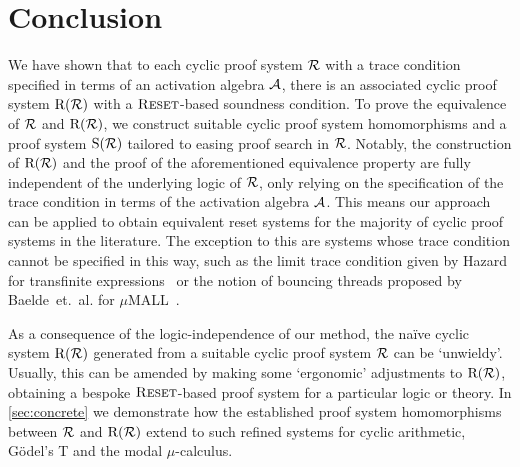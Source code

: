 \section{Conclusion}
\label{sec:conclusion}

We have shown that to each cyclic proof system $\mathcal{R}$ with a trace condition
specified in terms of an activation algebra $\mathcal{A}$, there is an associated cyclic
proof system $\mathrm{R}(\mathcal{R})$ with a $\textsc{Reset}$-based soundness condition.
To prove the equivalence of $\mathcal{R}$ and $\mathrm{R}(\mathcal{R})$, we construct suitable cyclic proof
system homomorphisms and a proof system $\mathrm{S}(\mathcal{R})$ tailored to easing proof
search in $\mathcal{R}$. Notably, the construction of $\mathrm{R}(\mathcal{R})$ and the proof of the
aforementioned equivalence property
are fully independent of the underlying logic of $\mathcal{R}$, only relying on
the specification of the trace condition in terms of the activation algebra \( \mathcal{A} \).
This means our approach can be applied to obtain equivalent reset systems
for the majority of cyclic proof systems in the literature.
The exception to this are systems whose trace condition
cannot be specified in this way, such as the limit trace condition given by Hazard
for transfinite expressions~\parencite{hazardCyclicProofsTransfinite2022} or the notion of
bouncing threads proposed by Baelde~et.~al. for
$\mu$MALL~\parencite{baeldeBouncingThreadsCircular2022}.

As a consequence of the logic-independence of our method, the na\"ive cyclic
system $\mathrm{R}(\mathcal{R})$ generated from a suitable cyclic proof system $\mathcal{R}$ can be
`unwieldy'. Usually, this can be amended by making some `ergonomic' adjustments
to $\mathrm{R}(\mathcal{R})$, obtaining a bespoke $\textsc{Reset}$-based proof system for a particular logic or theory. 
In \cref{sec:concrete} we demonstrate how the established proof system homomorphisms between \( \mathcal{R} \) and \( \mathrm{R}(\mathcal{R}) \) extend to such refined systems for cyclic arithmetic, Gödel's T and the modal $\mu$-calculus.

